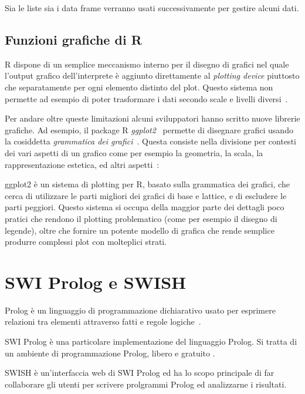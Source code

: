 \documentclass[10pt,titlepage,twoside,a4paper]{report}
\begin{document}
Sia le liste sia i data frame verranno usati successivamente per gestire alcuni  
dati.

    \subsection{Funzioni grafiche di R}
R dispone di un semplice meccanismo interno per il disegno di grafici 
nel quale l'output grafico dell'interprete è aggiunto direttamente al 
\emph{plotting device} piuttosto che separatamente per ogni elemento distinto 
del plot. Questo sistema non permette ad esempio di poter trasformare i dati 
secondo scale e livelli diversi~\cite{ggplot2VsRbaseGraphics}.

Per andare oltre queste limitazioni alcuni sviluppatori hanno scritto nuove 
librerie grafiche. Ad esempio, il package R \emph{ggplot2}~\cite{ggplot2}
permette di disegnare grafici usando la cosiddetta \emph{grammatica dei 
grafici}~\cite{grammarOfGraphics}. Questa consiste nella divisione per 
contesti dei vari aspetti di un grafico come per esempio la geometria, la 
scala, la rappresentazione estetica, ed altri 
aspetti~\cite{ggplot2OriginalDefinition}:

\begin{displayquote}
ggplot2 è un sistema di plotting per R, basato sulla grammatica dei grafici,
che cerca di utilizzare le parti migliori dei grafici di base e lattice, e di 
escludere le parti peggiori. Questo sistema si occupa della maggior parte dei
dettagli poco pratici che rendono il plotting problematico (come per esempio 
il disegno di legende), oltre che fornire un potente modello di grafica che
rende semplice produrre complessi plot con molteplici strati.
\end{displayquote}


\section{SWI Prolog e SWISH}
Prolog è un linguaggio di programmazione dichiarativo usato per 
esprimere relazioni tra elementi attraverso fatti e regole 
logiche~\cite{prolog}.

SWI Prolog è una particolare implementazione del linguaggio Prolog. Si tratta 
di un ambiente di programmazione Prolog, libero e gratuito 
\cite{swiprolog}.

SWISH è un'interfaccia web di SWI Prolog \cite{swish}
ed ha lo scopo principale di far collaborare gli utenti per scrivere 
prolgrammi Prolog ed analizzarne i risultati.
\end{document}
